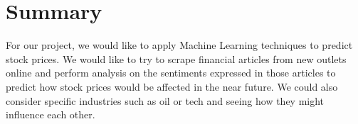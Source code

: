 \documentclass{article}
\begin{document}
\section{Summary}
For our project, we would like to apply Machine Learning techniques to predict
stock prices. We would like to try to scrape financial articles from new
outlets online and perform analysis on the sentiments expressed in those
articles to predict how stock prices would be affected in the near future. We
could also consider specific industries such as oil or tech and seeing how they
might influence each other.
\end{document}
